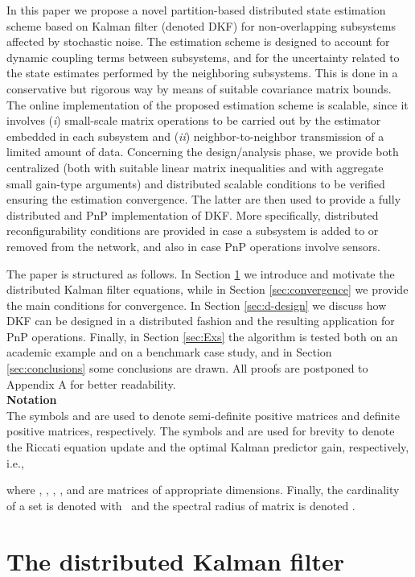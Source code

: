 \documentclass[journal,10pt,draftcls,onecolumn]{IEEEtran}
\begin{document}
In this paper we propose a novel partition-based distributed state estimation scheme based on Kalman filter (denoted DKF) for non-overlapping subsystems affected by stochastic noise. The estimation scheme is designed to account for dynamic coupling terms between subsystems, and for the uncertainty related to the state estimates performed by the neighboring subsystems. This is done in a conservative but rigorous way by means of suitable covariance matrix bounds. The online implementation of the proposed estimation scheme is scalable, since it involves (\emph{i}) small-scale matrix operations to be carried out by the estimator embedded in each subsystem and (\emph{ii}) neighbor-to-neighbor transmission of a limited amount of data. Concerning the design/analysis phase, we provide both centralized (both with suitable linear matrix inequalities and with aggregate small gain-type arguments) and distributed scalable conditions to be verified ensuring the estimation convergence. The latter are then used to provide a fully distributed and PnP implementation of DKF. More specifically, distributed reconfigurability conditions are provided in case a subsystem is added to or removed from the network, and also in case PnP operations involve sensors.

The paper is structured as follows. In Section \ref{sec:statement} we introduce and motivate the distributed Kalman filter equations, while in Section \ref{sec:convergence} we provide the main conditions for convergence. In Section \ref{sec:d-design} we discuss how DKF can be designed in a distributed fashion and the resulting application for PnP operations. Finally, in Section \ref{sec:Exs} the algorithm is tested both on an academic example and on a benchmark case study, and in Section \ref{sec:conclusions} some conclusions are drawn. All proofs are postponed to Appendix A for better readability.\\
\noindent
\textbf{Notation}\\
The symbols  and  are used to denote semi-definite positive matrices and definite positive matrices, respectively. The symbols  and  are used for brevity to denote the Riccati equation update and the optimal Kalman predictor gain, respectively, i.e.,

where , , , , and  are matrices of appropriate dimensions. Finally, the cardinality of a set  is denoted with~ and the spectral radius of matrix  is denoted .
\section{The distributed Kalman filter}
\label{sec:statement}
\end{document}
